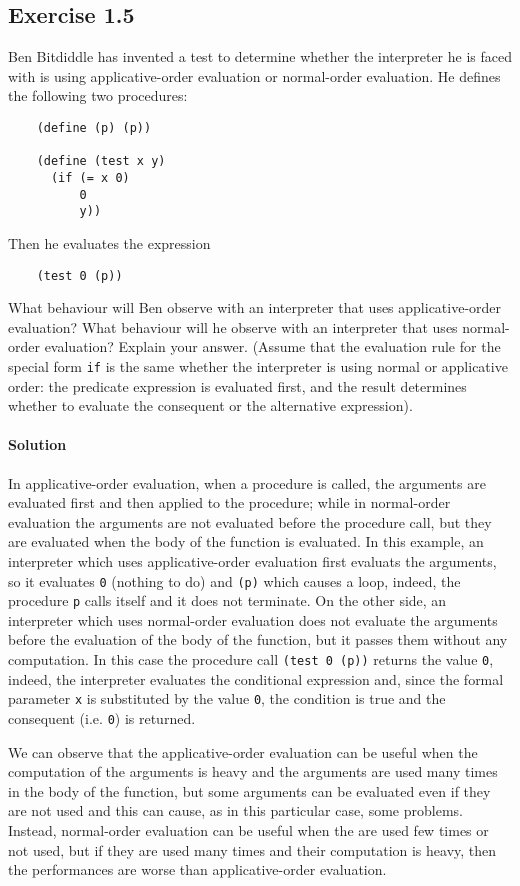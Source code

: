 \subsection*{Exercise 1.5}
Ben Bitdiddle has invented a test to determine whether the interpreter he is faced with is using applicative-order evaluation 
or normal-order evaluation. He defines the following two procedures:

\begin{lstlisting}
    (define (p) (p))

    (define (test x y)
      (if (= x 0)
          0
          y))
\end{lstlisting}

Then he evaluates the expression

\begin{lstlisting}
    (test 0 (p))
\end{lstlisting}

What behaviour will Ben observe with an interpreter that uses applicative-order evaluation? What behaviour will he
observe with an interpreter that uses normal-order evaluation? Explain your answer. (Assume that the evaluation
rule for the special form \texttt{if} is the same whether the interpreter is using normal or applicative order: the predicate 
expression is evaluated first, and the result determines whether to evaluate the consequent or the alternative expression).

\paragraph{Solution}
In applicative-order evaluation, when a procedure is called, the arguments are evaluated first and then applied to the
procedure; while in normal-order evaluation the arguments are not evaluated before the procedure call, but they are evaluated
when the body of the function is evaluated.
In this example, an interpreter which uses applicative-order evaluation first evaluats the arguments, so it evaluates \texttt{0} 
(nothing to do) and \texttt{(p)} which causes a loop, indeed, the procedure \texttt{p} calls itself and it does not terminate.
On the other side, an interpreter which uses normal-order evaluation does not evaluate the arguments before the evaluation of
the body of the function, but it passes them without any computation. In this case the procedure call \texttt{(test 0 (p))}
returns the value \texttt{0}, indeed, the interpreter evaluates the conditional expression and, since the formal parameter \texttt{x}
is substituted by the value \texttt{0}, the condition is true and the consequent (i.e. \texttt{0}) is returned.

We can observe that the applicative-order evaluation can be useful when the computation of the arguments is heavy and the arguments are
used many times in the body of the function, but some arguments can be evaluated even if they are not used and this can cause,
as in this particular case, some problems.
Instead, normal-order evaluation can be useful when the are used few times or not used, but if they are used many times and their
computation is heavy, then the performances are worse than applicative-order evaluation.
